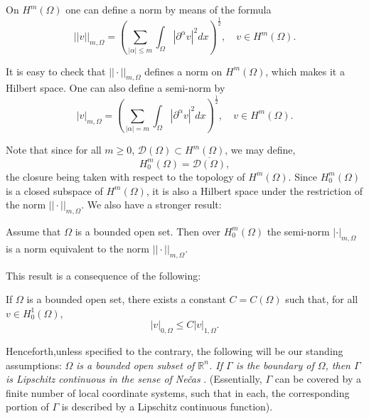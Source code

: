 On $H^{m}(\Omega)$ one can define a norm by means of the formula
\begin{equation*}
||v||_{m,\Omega}=\left(\sum_{|\alpha|\leq
  m}\int_{\Omega}|\partial^{\alpha}v|^{2}dx\right)^{\frac{1}{2}},\quad
v\in H^{m}(\Omega).\tag{2.6}\label{chap2-eq2.6} 
\end{equation*}

It is easy to check that $||\cdot ||_{m,\Omega}$ defines a norm on
$H^{m}(\Omega)$, which makes it a Hilbert space. One can also define a
semi-norm by
\begin{equation*}
|v|_{m,\Omega}=\left(\sum_{|\alpha|=m}\int_{\Omega}|\partial^{\alpha}v|^{2}dx\right)^{\frac{1}{2}},\quad
v\in H^{m}(\Omega).\tag{2.7}\label{chap2-eq2.7}
\end{equation*}

Note that since for all $m\geq 0$, $\mathscr{D}(\Omega)\subset
H^{m}(\Omega)$, we may define,
\begin{equation*}
H^{m}_{0}(\Omega)=\overline{\mathscr{D}(\Omega)},\tag{2.8}\label{chap2-eq2.8} 
\end{equation*}
the closure being taken with respect to the topology of
$H^{m}(\Omega)$. Since $H^{m}_{0}(\Omega)$ is a closed subspace of
$H^{m}(\Omega)$, it is also a Hilbert space under the restriction of
the norm $||\cdot||_{m,\Omega}$. We also have a stronger result:

\begin{theorem}\label{chap2-thm2.1}
Assume that $\Omega$ is a bounded open set. Then over
$H^{m}_{0}(\Omega)$ the semi-norm $|\cdot|_{m,\Omega}$ is a norm
equivalent to the norm $||\cdot||_{m,\Omega}$.
\end{theorem}

This result is a consequence of the following:

\begin{theorem}\label{chap2-thm2.2}
If $\Omega$ is a bounded open set, there exists a constant
$C=C(\Omega)$ such that, for all $v\in H^{1}_{0}(\Omega)$,
\begin{equation*}
|v|_{0,\Omega}\leq C|v|_{1,\Omega}.\tag{2.9}\label{chap2-eq2.9}
\end{equation*}
\end{theorem}

Henceforth,\pageoriginale unless specified to the contrary, the
following will be our standing assumptions: $\Omega$ {\em is a bounded
  open subset of $\mathbb{R}^{n}$. If $\Gamma$ is the boundary of
  $\Omega$, then $\Gamma$ is Lipschitz continuous in the sense of
  Ne\v{c}as} \cite{key20}. (Essentially, $\Gamma$ can be covered by a
  finite number of local coordinate systems, such that in each, the
  corresponding portion of $\Gamma$ is described by a Lipschitz
  continuous function).

